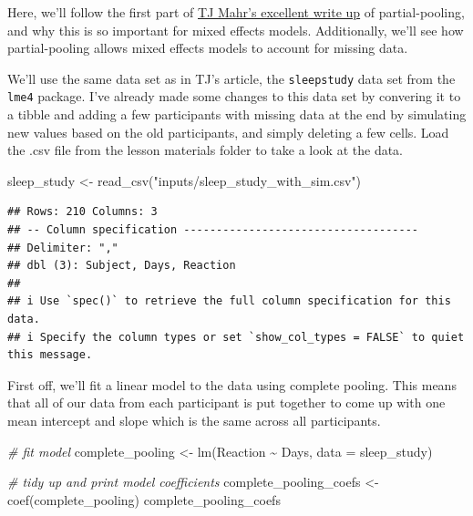 \documentclass[
]{book}
\newenvironment{Shaded}{\begin{snugshade}}{\end{snugshade}}
\newcommand{\AttributeTok}[1]{\textcolor[rgb]{0.77,0.63,0.00}{#1}}
\newcommand{\CommentTok}[1]{\textcolor[rgb]{0.56,0.35,0.01}{\textit{#1}}}
\newcommand{\FunctionTok}[1]{\textcolor[rgb]{0.00,0.00,0.00}{#1}}
\newcommand{\NormalTok}[1]{#1}
\newcommand{\OtherTok}[1]{\textcolor[rgb]{0.56,0.35,0.01}{#1}}
\newcommand{\SpecialCharTok}[1]{\textcolor[rgb]{0.00,0.00,0.00}{#1}}
\newcommand{\StringTok}[1]{\textcolor[rgb]{0.31,0.60,0.02}{#1}}
\begin{document}
Here, we'll follow the first part of \href{https://tjmahr.github.io/plotting-partial-pooling-in-mixed-effects-models/}{TJ Mahr's excellent write up} of partial-pooling, and why this is so important for mixed effects models. Additionally, we'll see how partial-pooling allows mixed effects models to account for missing data.

We'll use the same data set as in TJ's article, the \texttt{sleepstudy} data set from the \texttt{lme4} package. I've already made some changes to this data set by convering it to a tibble and adding a few participants with missing data at the end by simulating new values based on the old participants, and simply deleting a few cells. Load the .csv file from the lesson materials folder to take a look at the data.

\begin{Shaded}
\begin{Highlighting}[]
\NormalTok{sleep\_study }\OtherTok{\textless{}{-}} \FunctionTok{read\_csv}\NormalTok{(}\StringTok{"inputs/sleep\_study\_with\_sim.csv"}\NormalTok{)}
\end{Highlighting}
\end{Shaded}

\begin{verbatim}
## Rows: 210 Columns: 3
## -- Column specification ------------------------------------
## Delimiter: ","
## dbl (3): Subject, Days, Reaction
## 
## i Use `spec()` to retrieve the full column specification for this data.
## i Specify the column types or set `show_col_types = FALSE` to quiet this message.
\end{verbatim}

First off, we'll fit a linear model to the data using complete pooling. This means that all of our data from each participant is put together to come up with one mean intercept and slope which is the same across all participants.

\begin{Shaded}
\begin{Highlighting}[]
\CommentTok{\# fit model}
\NormalTok{complete\_pooling }\OtherTok{\textless{}{-}} \FunctionTok{lm}\NormalTok{(Reaction }\SpecialCharTok{\textasciitilde{}}\NormalTok{ Days, }\AttributeTok{data =}\NormalTok{ sleep\_study)}

\CommentTok{\# tidy up and print model coefficients}
\NormalTok{complete\_pooling\_coefs }\OtherTok{\textless{}{-}} \FunctionTok{coef}\NormalTok{(complete\_pooling)}
\NormalTok{complete\_pooling\_coefs}
\end{Highlighting}
\end{Shaded}
\end{document}
